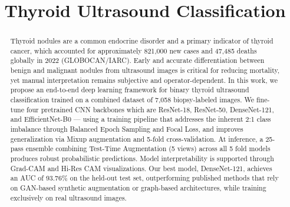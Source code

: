 \documentclass[conference]{IEEEtran}
\begin{document}
\title{Thyroid Ultrasound Classification}


\author{
  \and
  \and
  \and
  \and
  \and
}

\maketitle


\begin{abstract}
Thyroid nodules are a common endocrine disorder and a primary indicator of thyroid cancer,
which accounted for approximately 821,000 new cases and 47,485 deaths globally in 2022
(GLOBOCAN/IARC). Early and accurate differentiation between benign and malignant nodules
from ultrasound images is critical for reducing mortality, yet manual interpretation remains
subjective and operator-dependent. In this work, we propose an end-to-end deep learning
framework for binary thyroid ultrasound classification trained on a combined dataset of 7,058
biopsy-labeled images. We fine-tune four pretrained CNN backbones which are ResNet-18,
ResNet-50, DenseNet-121, and EfficientNet-B0 --- using a training pipeline that addresses the
inherent 2:1 class imbalance through Balanced Epoch Sampling and Focal Loss, and improves
generalization via Mixup augmentation and 5-fold cross-validation. At inference, a 25-pass
ensemble combining Test-Time Augmentation (5 views) across all 5 fold models produces robust
probabilistic predictions. Model interpretability is supported through Grad-CAM and Hi-Res CAM
visualizations. Our best model, DenseNet-121, achieves an AUC of 93.76\% on the held-out test
set, outperforming published methods that rely on GAN-based synthetic augmentation or
graph-based architectures, while training exclusively on real ultrasound images.
\end{abstract}
\end{document}
